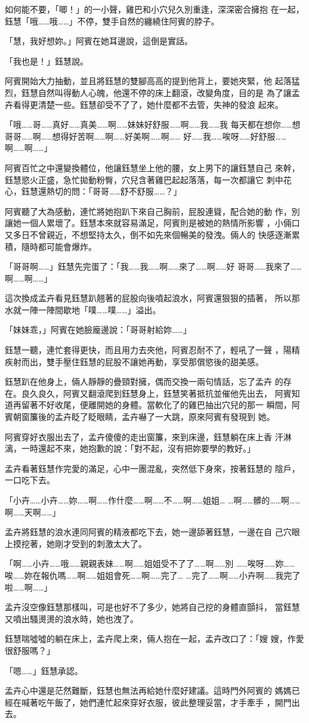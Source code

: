 如何能不要，「唧！」的一小聲，雞巴和小穴兒久別重逢，深深密合擁抱
在一起，鈺慧「哦……哦……」不停，雙手自然的纏繞住阿賓的脖子。

「慧，我好想妳。」阿賓在她耳邊說，這倒是實話。

「我也是！」鈺慧說。

阿賓開始大力抽動，並且將鈺慧的雙腳高高的提到他背上，要她夾緊，他
起落猛烈，鈺慧自然叫得動人心魄，他還不停的床上翻滾，改變角度，目的是
為了讓孟卉看得更清楚一些。鈺慧卻受不了了，她什麼都不去管，失神的發浪
起來。

「哦……哥……真好……真美……啊……妹妹好舒服……啊……我……我
每天都在想你……想哥哥……啊……想得好苦啊……啊……好美啊……啊……
好……我……唉呀……好舒服……啊……啊……」

阿賓百忙之中還變換體位，他讓鈺慧坐上他的腰，女上男下的讓鈺慧自己
來幹，鈺慧慾火正盛，急忙拋動粉臀，穴兒含著雞巴起起落落，每一次都讓它
刺中花心，鈺慧還熱切的問：「哥哥……舒不舒服……？」

阿賓聽了大為感動，連忙將她抱趴下來自己胸前，屁股連聳，配合她的動
作，別讓她一個人累壞了。鈺慧本來就容易滿足，阿賓則是被她的熱情所影響
，小倆口又多日不曾親近，不想堅持太久，倒不如先來個暢美的發洩。倆人的
快感逐漸累積，隨時都可能會爆炸。

「哥哥啊……」鈺慧先完蛋了：「我……我……啊……來了……啊……好
哥哥……我來了……啊……啊……」

這次換成孟卉看見鈺慧趴翹著的屁股向後噴起浪水，阿賓還狠狠的插著，
所以那水就一陣一陣間歇地「噗……噗……」溢出。

「妹妹乖，」阿賓在她臉龐邊說：「哥哥射給妳……」

鈺慧一聽，連忙套得更快，而且用力去夾他，阿賓忍耐不了，輕吼了一聲
，陽精疾射而出，雙手壓住鈺慧的屁股不讓她再動，享受那償慾後的甜美感。

鈺慧趴在他身上，倆人靜靜的疊頸對擁，偶而交換一兩句情話，忘了孟卉
的存在。良久良久，阿賓又翻滾爬到鈺慧身上，鈺慧笑著抵抗並催他先出去，
阿賓知道再留著不好收尾，便離開她的身體。當軟化了的雞巴抽出穴兒的那一
瞬間，阿賓朝窗簾後的孟卉眨了眨眼睛，孟卉嚇了一大跳，原來阿賓有發現到
她。

阿賓穿好衣服出去了，孟卉傻傻的走出窗簾，來到床邊，鈺慧躺在床上香
汗淋漓，一時還起不來，她抱歉的說：「對不起，沒有把妳要學的教好。」

孟卉看著鈺慧作完愛的滿足，心中一團混亂，突然低下身來，按著鈺慧的
陰戶，一口吃下去。

「小卉……小卉……妳……啊……作什麼……啊……不……啊……姐姐…
…啊……髒的……啊……啊……天啊……」

孟卉將鈺慧的浪水連同阿賓的精液都吃下去，她一邊舔著鈺慧，一邊在自
己穴眼上摸挖著，她剛才受到的刺激太大了。

「啊……小卉……哦……親親表妹……啊……姐姐受不了了……啊……別
……唉呀……妳……唉……妳在報仇嗎……啊……姐姐會死……啊……完了…
…完了……啊……小卉啊……我完了啦……啊……」

孟卉沒空像鈺慧那樣叫，可是也好不了多少，她將自己挖的身體直顫抖，
當鈺慧又噴出騷燙燙的浪水時，她也洩了。

鈺慧喘噓噓的躺在床上，孟卉爬上來，倆人抱在一起，孟卉改口了：「嫂
嫂，作愛很舒服嗎？」

「嗯……」鈺慧承認。

孟卉心中還是茫然難斷，鈺慧也無法再給她什麼好建議。這時門外阿賓的
媽媽已經在喊著吃午飯了，她們連忙起來穿好衣服，彼此整理妥當，才手牽手
，開門出去。










